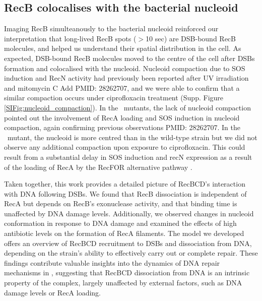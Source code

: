 \subsection*{RecB colocalises with the bacterial nucleoid}
Imaging RecB simulteanously to the bacterial nucleoid reinforced our interpretation that long-lived RecB spots ($>$10 sec) are DSB-bound RecB molecules, and helped us understand their spatial distribution in the cell. As expected, DSB-bound RecB molecules moved to the centre of the cell after DSBs formation and colocalised with the nucleoid. Nucleoid compaction due to SOS induction and RecN activity had previously been reported after UV irradiation and mitomycin C \cite{Odsbu2014} Add PMID: 28262707, and we were able to confirm that a similar compaction occurs under ciprofloxacin treatment (Supp. Figure \ref{SIFig:nucleoid_compaction}). In the \dreca\ mutants, the lack of nucleoid compaction pointed out the involvement of RecA loading and SOS induction in nucleoid compaction, again confirming previous observations \cite{Odsbu2014}PMID: 28262707. In the \geneteneighty\ mutant, the nucleoid is more centred than in the wild-type strain but we did not observe any additional compaction upon exposure to ciprofloxacin. This could result from a substantial delay in SOS induction and recN expression as a result of the loading of RecA by the RecFOR alternative pathway \cite{Lepore2025}.

Taken together, this work provides a detailed picture of RecBCD's interaction with DNA following DSBs. We found that RecB dissociation is independent of RecA but depends on RecB's exonuclease activity, and that binding time is unaffected by DNA damage levels. Additionally, we observed changes in nucleoid conformation in response to DNA damage and examined the effects of high antibiotic levels on the formation of RecA filaments. The model we developed offers an overview of RecBCD recruitment to DSBs and dissociation from DNA, depending on the strain's ability to effectively carry out or complete repair.
These findings contribute valuable insights into the dynamics of DNA repair mechanisms in \ecoli, suggesting that RecBCD dissociation from DNA is an intrinsic property of the complex, largely unaffected by external factors, such as DNA damage levels or RecA loading.